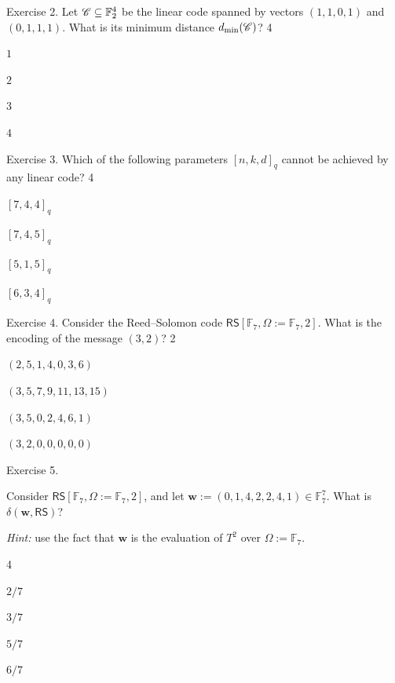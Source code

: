 \documentclass[../../book]{subfiles}
\begin{document}
\begin{xexercise}
  {Exercise 2.}
  {Let $\mathscr{C} \subseteq \mathbb{F}_2^4$ be the linear code spanned by vectors $(1,1,0,1)$ and $(0,1,1,1)$. What is its
  minimum distance $d_{\min}(\mathscr{C})$?}
  {4}
  {
    \item $1$
    \item $2$
    \item $3$
    \item $4$
  }
\end{xexercise}

\begin{xexercise}
  {Exercise 3.}
  {Which of the following parameters $[n,k,d]_q$ cannot be achieved by any linear code?}
  {4}
  {
    \item $[7,4,4]_q$
    \item $[7,4,5]_q$
    \item $[5,1,5]_q$
    \item $[6,3,4]_q$
  }
\end{xexercise}

\begin{xexercise}
  {Exercise 4.}
  {Consider the Reed--Solomon code $\mathsf{RS}[\mathbb{F}_7,\Omega:=\mathbb{F}_7,2]$.
  What is the encoding of the message $(3,2)$?}
  {2}
  {
    \item $(2,5,1,4,0,3,6)$
    \item $(3,5,7,9,11,13,15)$
    \item $(3,5,0,2,4,6,1)$
    \item $(3,2,0,0,0,0,0)$
  }
\end{xexercise}

\begin{xexercise}
  {Exercise 5.}
  {Consider $\mathsf{RS}[\mathbb{F}_7,\Omega:=\mathbb{F}_7,2]$, and let
  $\mathbf{w} := (0,1,4,2,2,4,1) \in \mathbb{F}_7^7$. What is $\delta(\mathbf{w}, \mathsf{RS})$?
  
  \textit{Hint:} use the fact that $\mathbf{w}$ is the evaluation of $T^2$ over $\Omega := \mathbb{F}_7$.}
  {4}
  {
    \item $2/7$
    \item $3/7$
    \item $5/7$
    \item $6/7$
  }
\end{xexercise}
\end{document}
